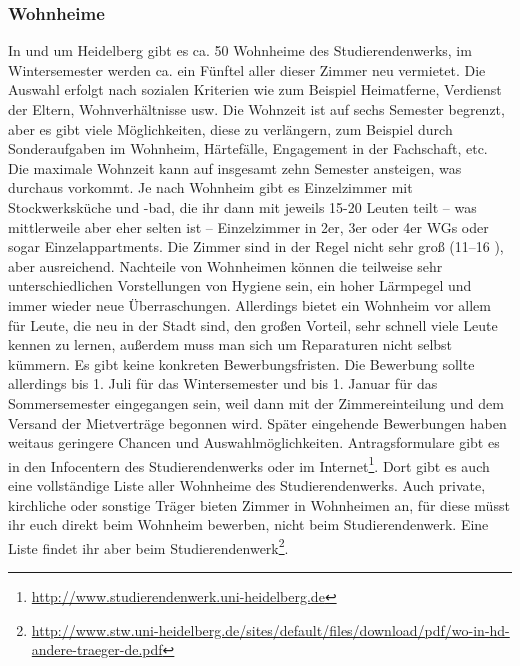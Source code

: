 \subsubsection{Wohnheime}


In und um Heidelberg gibt es ca. 50 Wohnheime des Studierendenwerks, im Wintersemester werden ca. ein Fünftel aller dieser Zimmer neu vermietet. Die Auswahl erfolgt nach sozialen Kriterien wie zum Beispiel Heimatferne, Verdienst der Eltern, Wohnverhältnisse usw. Die Wohnzeit ist auf sechs Semester begrenzt, aber es gibt viele Möglichkeiten, diese zu verlängern, zum Beispiel durch Sonderaufgaben im Wohnheim, Härtefälle, Engagement in der Fachschaft, etc. Die maximale Wohnzeit kann auf insgesamt zehn Semester ansteigen, was durchaus vorkommt. Je nach Wohnheim gibt es Einzelzimmer mit Stockwerksküche und -bad, die ihr dann mit jeweils 15-20 Leuten teilt -- was mittlerweile aber eher selten ist -- Einzelzimmer in 2er, 3er oder 4er WGs oder sogar Einzelappartments. Die Zimmer sind in der Regel nicht sehr groß (11--16 \squaren\metre), aber ausreichend. Nachteile von Wohnheimen können die teilweise sehr unterschiedlichen Vorstellungen von Hygiene sein, ein hoher Lärmpegel und immer wieder neue Überraschungen. Allerdings bietet ein Wohnheim vor allem für Leute, die neu in der Stadt sind, den großen Vorteil, sehr schnell viele Leute kennen zu lernen, außerdem muss man sich um Reparaturen nicht selbst kümmern. Es gibt keine konkreten Bewerbungsfristen. Die Bewerbung sollte allerdings bis 1. Juli für das Wintersemester und bis 1. Januar für das Sommersemester eingegangen sein, weil dann mit der Zimmereinteilung und dem Versand der Mietverträge begonnen wird. Später eingehende Bewerbungen haben weitaus geringere Chancen und Auswahlmöglichkeiten. Antragsformulare gibt es in den Infocentern des Studierendenwerks oder im Internet\footnote{\url{http://www.studierendenwerk.uni-heidelberg.de}}. Dort gibt es auch eine vollständige Liste aller Wohnheime des Studierendenwerks. Auch private, kirchliche oder sonstige Träger bieten Zimmer in Wohnheimen an, für diese müsst ihr euch direkt beim Wohnheim bewerben, nicht beim Studierendenwerk. Eine Liste findet ihr aber beim Studierendenwerk\footnote{\url{http://www.stw.uni-heidelberg.de/sites/default/files/download/pdf/wo-in-hd-andere-traeger-de.pdf}}.
